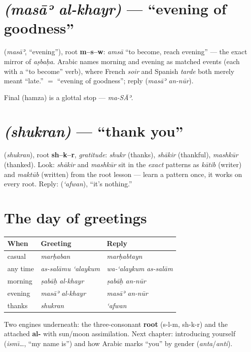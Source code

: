 \section{ \emph{(mas\=aʾ al-khayr)} --- ``evening of goodness''}
\label{lesson:masa-al-khayr}

\begin{cousinweb}
 (\emph{mas\=aʾ}, ``evening''), root \textbf{m--s--w}: \emph{ams\=a}
``to become, reach evening'' --- the exact mirror of \emph{a\d{s}ba\d{h}a}.
Arabic names morning and evening as matched events (each with a ``to become''
verb), where French \emph{soir} and Spanish \emph{tarde} both merely meant
``late.''  $=$ ``evening of goodness''; reply 
(\emph{mas\=aʾ an-n\=ur}).
\end{cousinweb}

\begin{sounds}
Final  (hamza) is a glottal stop --- \emph{ma-S\=Aʾ}.
\end{sounds}

\section{ \emph{(shukran)} --- ``thank you''}
\label{lesson:shukran}

\begin{cousinweb}
 (\emph{shukran}), root \textbf{sh--k--r}, \emph{gratitude}:
\emph{shukr} (thanks), \emph{sh\=akir} (thankful), \emph{mashk\=ur} (thanked).
Look: \emph{sh\=akir} and \emph{mashk\=ur} sit in the \emph{exact} patterns as
\emph{k\=atib} (writer) and \emph{makt\=ub} (written) from the root lesson ---
learn a pattern once, it works on every root. Reply: 
(\emph{`afwan}), ``it's nothing.''
\end{cousinweb}

\section{The day of greetings}
\label{lesson:ch1-practice}

\begin{center}
\begin{tabular}{@{}lll@{}}
\toprule
When & Greeting & Reply \\
\midrule
casual & \emph{mar\d{h}aban} & \emph{mar\d{h}abtayn} \\
any time & \emph{as-sal\=amu `alaykum} & \emph{wa-`alaykum as-sal\=am} \\
morning & \emph{\d{s}ab\=a\d{h} al-khayr} & \emph{\d{s}ab\=a\d{h} an-n\=ur} \\
evening & \emph{mas\=aʾ al-khayr} & \emph{mas\=aʾ an-n\=ur} \\
thanks & \emph{shukran} & \emph{`afwan} \\
\bottomrule
\end{tabular}
\end{center}

Two engines underneath: the three-consonant \textbf{root} (s-l-m, sh-k-r) and
the attached \textbf{al-} with sun/moon assimilation. Next chapter: introducing
yourself (\emph{ism\=\i\ldots}, ``my name is'') and how Arabic marks ``you'' by
gender (\emph{anta}/\emph{anti}).
